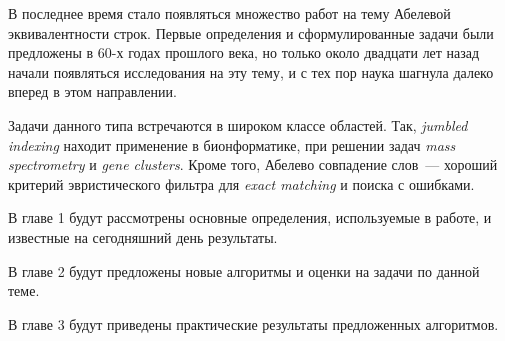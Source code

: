 
В последнее время стало появляться множество работ на тему Абелевой эквивалентности строк. Первые определения и сформулированные задачи были предложены в 60-х годах прошлого века, но только около двадцати лет назад начали появляться исследования на эту тему, и с тех пор наука шагнула далеко вперед в этом направлении.

Задачи данного типа встречаются в широком классе областей. Так, \textit{jumbled indexing} находит применение в бионформатике, при решении задач \textit{mass spectrometry} и \textit{gene clusters}. Кроме того, Абелево совпадение слов~--- хороший критерий эвристического фильтра для \textit{exact matching} и поиска с ошибками.

В главе 1 будут рассмотрены основные определения, используемые в работе, и известные на сегодняшний день результаты.

В главе 2 будут предложены новые алгоритмы и оценки на задачи по данной теме.

В главе 3 будут приведены практические результаты предложенных алгоритмов.


